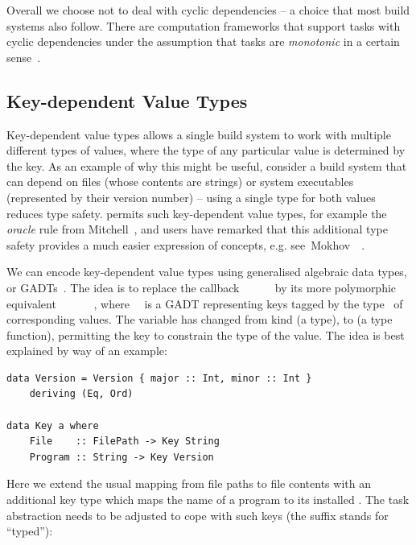 Overall we choose not to deal with cyclic dependencies -- a choice that most build
systems also follow. There are computation frameworks that support tasks with
cyclic dependencies under the assumption that tasks are \emph{monotonic} in a
certain sense~\cite{pottier2009lazy,radul2009propagation}.

\subsection{Key-dependent Value Types}\label{sec-polymorphism}

Key-dependent value types allows a single build system to work with multiple different
types of values, where the type of any particular value is determined by the key. As an example
of why this might be useful, consider a build system that can depend on files
(whose contents are strings) or system executables (represented by their version number) --
using a single type for both values reduces type safety.
\Shake permits such key-dependent value types, for example the \emph{oracle} rule from
Mitchell~, and users have remarked that this additional type safety
provides a much easier expression of concepts, e.g. see~Mokhov~\etal~.

We can encode key-dependent value types using generalised algebraic data types,
or GADTs~\cite{spj2006gadts}. The idea is to replace
the callback ~\hs{::}~~\hs{->}~~ by its
more polymorphic equivalent ~\hs{::}~~~\hs{->}~~,
where~~ is a GADT representing keys tagged by the type~ of
corresponding values. The variable  has changed from kind \hs{*} (a type),
to \hs{* -> *} (a type function), permitting the key to constrain the type of the value.
The idea is best explained by way of an example:

\vspace{1mm}
\begin{verbatim}
data Version = Version { major :: Int, minor :: Int }
    deriving (Eq, Ord)

data Key a where
    File    :: FilePath -> Key String
    Program :: String -> Key Version
\end{verbatim}
\vspace{1mm}

\noindent
Here we extend the usual mapping from file paths to file contents with an
additional key type  which maps the name of a program to its installed . The task
abstraction needs to be adjusted to cope with such keys (the suffix 
stands for ``typed''):

